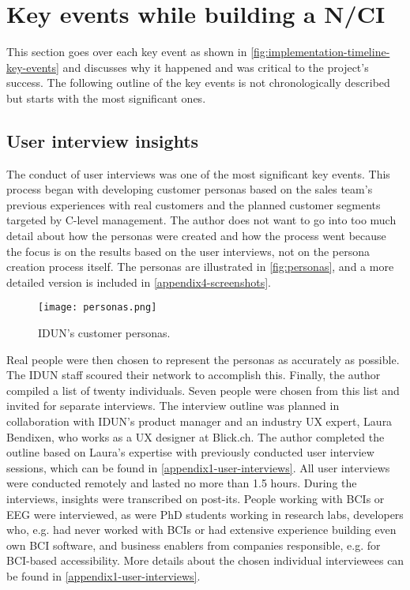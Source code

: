 \section{Key events while building a N/CI}
\label{chapter4-key-events}

This section goes over each key event as shown in \autoref{fig:implementation-timeline-key-events} and discusses why it happened and was critical to the project's success. The following outline of the key events is not chronologically described but starts with the most significant ones.

\subsection{User interview insights}
\label{chapter4-user-interview-insights}

The conduct of user interviews was one of the most significant key events. This process began with developing customer personas based on the sales team's previous experiences with real customers and the planned customer segments targeted by C-level management. The author does not want to go into too much detail about how the personas were created and how the process went because the focus is on the results based on the user interviews, not on the persona creation process itself. The personas are illustrated in \autoref{fig:personas}, and a more detailed version is included in \autoref{appendix4-screenshots}.

\begin{figure}[!ht]
  \centering
  \texttt{[image: personas.png]}
  \caption{IDUN's customer personas.}
  \label{fig:personas}
\end{figure}

Real people were then chosen to represent the personas as accurately as possible. The IDUN staff scoured their network to accomplish this. Finally, the author compiled a list of twenty individuals. Seven people were chosen from this list and invited for separate interviews. The interview outline was planned in collaboration with IDUN's product manager and an industry UX expert, Laura Bendixen, who works as a UX designer at Blick.ch. The author completed the outline based on Laura's expertise with previously conducted user interview sessions, which can be found in \autoref{appendix1-user-interviews}. All user interviews were conducted remotely and lasted no more than 1.5 hours. During the interviews, insights were transcribed on post-its. People working with BCIs or EEG were interviewed, as were PhD students working in research labs, developers who, e.g. had never worked with BCIs or had extensive experience building even own BCI software, and business enablers from companies responsible, e.g. for BCI-based accessibility. More details about the chosen individual interviewees can be found in \autoref{appendix1-user-interviews}.

